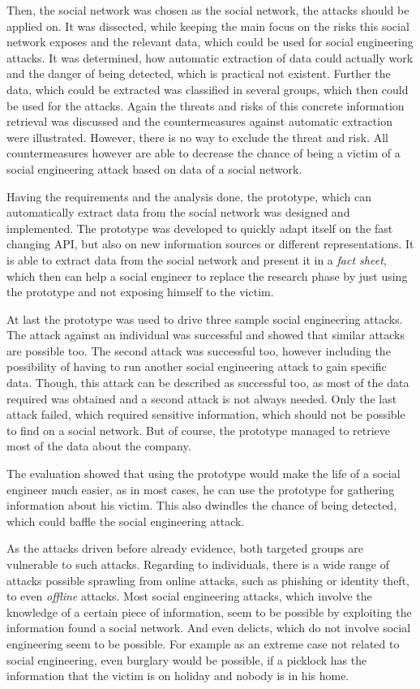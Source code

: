 Then, the \Twitter{} social network was chosen as the social network, the
attacks should be applied on. It was dissected, while keeping the main focus on the
risks this social network exposes and the relevant data, which could be used
for social engineering attacks. It was determined, how automatic extraction of
data could actually work and the danger of being detected, which is practical
not existent. Further the data, which could be extracted was classified in
several groups, which then could be used for the attacks. Again the threats and
risks of this concrete information retrieval was discussed and the
countermeasures against automatic extraction were illustrated. However, there
is no way to exclude the threat and risk. All countermeasures however are able
to decrease the chance of being a victim of a social engineering attack based
on data of a social network.

Having the requirements and the analysis done, the prototype, which can
automatically extract data from the \Twitter{} social network was designed and
implemented. The prototype was developed to quickly adapt itself on the fast
changing \Twitter{} API, but also on new information sources or different
representations. It is able to extract data from the social network and present
it in a \textit{fact sheet}, which then can help a social engineer to replace
the research phase by just using the prototype and not exposing himself to the
victim.

At last the prototype was used to drive three sample social engineering attacks.
The attack against an individual was successful and showed that similar
attacks are possible too. The second attack was successful too, however
including the possibility of having to run another social engineering attack to
gain specific data. Though, this attack can be described as successful too, as
most of the data required was obtained and a second attack is not always
needed. Only the last attack failed, which required sensitive information,
which should not be possible to find on a social network. But of course, the
prototype managed to retrieve most of the data about the company.

The evaluation showed that using the prototype would make the life of a social
engineer much easier, as in most cases, he can use the prototype for gathering
information about his victim. This also dwindles the chance of being detected,
which could baffle the social engineering attack.

As the attacks driven before already evidence, both targeted groups are
vulnerable to such attacks. Regarding to individuals, there is a wide range
of attacks possible sprawling from online attacks, such as phishing or identity
theft, to even \textit{offline} attacks. Most social engineering attacks, which
involve the knowledge of a certain piece of information, seem to be possible by
exploiting the information found a social network. And even delicts, which do
not involve social engineering seem to be possible. For example as an extreme
case not related to social engineering, even burglary would be possible, if a
picklock has the information that the victim is on holiday and nobody is in his
home.

